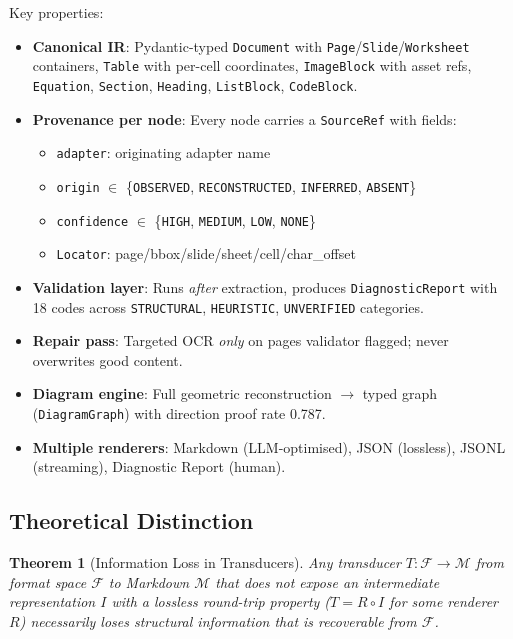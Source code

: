 \documentclass[10pt, conference, compsocconf]{IEEEtran}
\theoremstyle{plain}
\newtheorem{theorem}{Theorem}
\begin{document}
Key properties:
\begin{itemize}
    \item \textbf{Canonical IR}: Pydantic-typed \texttt{Document} with \texttt{Page}/\texttt{Slide}/\texttt{Worksheet} containers, \texttt{Table} with per-cell coordinates, \texttt{ImageBlock} with asset refs, \texttt{Equation}, \texttt{Section}, \texttt{Heading}, \texttt{ListBlock}, \texttt{CodeBlock}.
    \item \textbf{Provenance per node}: Every node carries a \texttt{SourceRef} with fields:
    \begin{itemize}
        \item \texttt{adapter}: originating adapter name
        \item \texttt{origin} $\in$ \{\texttt{OBSERVED}, \texttt{RECONSTRUCTED}, \texttt{INFERRED}, \texttt{ABSENT}\}
        \item \texttt{confidence} $\in$ \{\texttt{HIGH}, \texttt{MEDIUM}, \texttt{LOW}, \texttt{NONE}\}
        \item \texttt{Locator}: page/bbox/slide/sheet/cell/char\_offset
    \end{itemize}
    \item \textbf{Validation layer}: Runs \textit{after} extraction, produces \texttt{DiagnosticReport} with 18 codes across \texttt{STRUCTURAL}, \texttt{HEURISTIC}, \texttt{UNVERIFIED} categories.
    \item \textbf{Repair pass}: Targeted OCR \textit{only} on pages validator flagged; never overwrites good content.
    \item \textbf{Diagram engine}: Full geometric reconstruction $\to$ typed graph (\texttt{DiagramGraph}) with direction proof rate 0.787.
    \item \textbf{Multiple renderers}: Markdown (LLM-optimised), JSON (lossless), JSONL (streaming), Diagnostic Report (human).
\end{itemize}

\subsection{Theoretical Distinction}

\begin{theorem}[Information Loss in Transducers]
Any transducer $T: \mathcal{F} \to \mathcal{M}$ from format space $\mathcal{F}$ to Markdown $\mathcal{M}$ that does not expose an intermediate representation $I$ with a lossless round-trip property ($T = R \circ I$ for some renderer $R$) necessarily loses structural information that is recoverable from $\mathcal{F}$.
\end{theorem}
\end{document}

